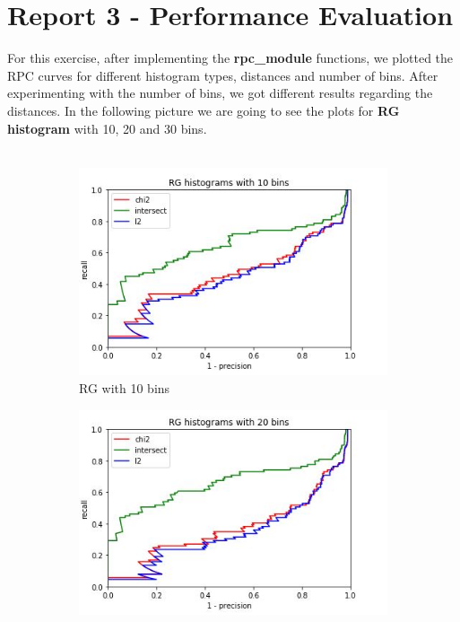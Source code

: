 \documentclass[
	12pt, %
]{fphw}
\begin{document}
\newpage
\section*{Report 3 - Performance Evaluation}

For this exercise, after implementing the \textbf{rpc\_module} functions, we plotted the RPC curves for different histogram types, distances and number of bins. After experimenting with the number of bins, we got different results regarding the distances. In the following picture we are going to see the plots for \textbf{RG histogram} with 10, 20 and 30 bins.\\ \\
\begin{figure}[h!]
     \centering
     \begin{subfigure}[b]{0.3\textwidth}
         \centering
         \includegraphics[width=\textwidth]{img/plots/RG_10.JPG}
         \caption{RG with 10 bins}
         \label{fig:y equals x}
     \end{subfigure}
     \hfill
     \begin{subfigure}[b]{0.3\textwidth}
         \centering
         \includegraphics[width=\textwidth]{img/plots/RG_20.JPG}

\end{subfigure}
\end{figure}
\end{document}
